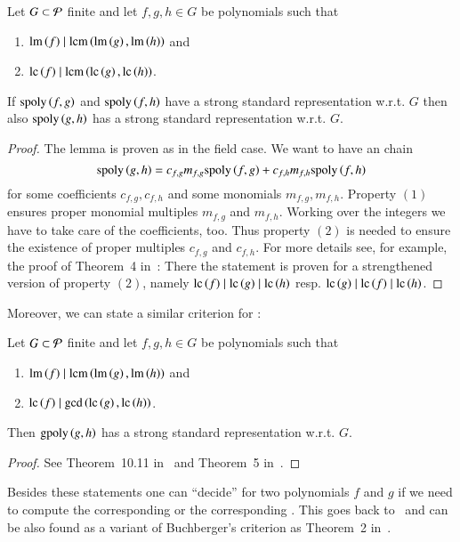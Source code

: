 \begin{lemma}
Let $G \subset \mathcal{P}$ finite and let $f,g,h \in G$ be polynomials such that
\begin{enumerate}
\item $\operatorname{lm}\left({f}\right) \mid \operatorname{lcm}\left(\operatorname{lm}\left({g}\right), \operatorname{lm}\left({h}\right)\right)$ and
\item $\mathrm{lc}\left({f}\right) \mid \operatorname{lcm}\left(\mathrm{lc}\left({g}\right), \mathrm{lc}\left({h}\right)\right)$.
\end{enumerate}
If $\mathrm{spoly}\left({f},{g}\right)$ and $\mathrm{spoly}\left({f},{h}\right)$ have a strong standard representation w.r.t.
$G$ then also $\mathrm{spoly}\left({g},{h}\right)$ has a strong standard representation w.r.t. $G$.
\label{thm:chain-crit}
\end{lemma}

\begin{proof}
The lemma is proven as in the field case. We want to have an \spt chain
\[\mathrm{spoly}\left({g},{h}\right) = c_{f,g} m_{f,g} \mathrm{spoly}\left({f},{g}\right) + c_{f,h} m_{f,h} \mathrm{spoly}\left({f},{h}\right)\]
for some coefficients $c_{f,g}, c_{f,h}$ and  some monomials $m_{f,g}, m_{f,h}$.
Property $(1)$ ensures proper monomial multiples $m_{f,g}$ and $m_{f,h}$.
Working over the integers we have to take care of the coefficients, too. Thus
property $(2)$ is needed to ensure the existence of proper multiples $c_{f,g}$
and $c_{f,h}$. For more details see, for example, the proof of Theorem~4
in~\cite{lichtblau2012}: There the statement is proven for a strengthened
version of property $(2)$, namely $\mathrm{lc}\left({f}\right) \mid \mathrm{lc}\left({g}\right) \mid \mathrm{lc}\left({h}\right)$ resp. $\mathrm{lc}\left({g}\right)
\mid \mathrm{lc}\left({f}\right) \mid \mathrm{lc}\left({h}\right)$.
\end{proof}

Moreover, we can state a similar criterion for \gpts:

\begin{lemma}
Let $G \subset \mathcal{P}$ finite and let $f,g,h \in G$ be polynomials such that
\begin{enumerate}
\item $\operatorname{lm}\left({f}\right) \mid \operatorname{lcm}\left(\operatorname{lm}\left({g}\right), \operatorname{lm}\left({h}\right)\right)$ and
\item $\mathrm{lc}\left({f}\right) \mid \gcd\left(\mathrm{lc}\left({g}\right), \mathrm{lc}\left({h}\right)\right)$.
\end{enumerate}
Then $\mathrm{gpoly}\left({g},{h}\right)$ has a strong standard representation w.r.t. $G$.
\label{thm:chain-crit-gcd}
\end{lemma}

\begin{proof}
See Theorem~10.11 in~\cite{bwkGroebnerBases1993} and Theorem~5
in~\cite{lichtblau2012}.
\end{proof}

Besides these statements one can ``decide'' for two polynomials $f$ and
$g$ if we need to compute the corresponding \gpt or the corresponding \spt.
This goes back to~\cite{kapur1988} and can be also found as a variant of
Buchberger's criterion as Theorem~2 in~\cite{lichtblau2012}.

